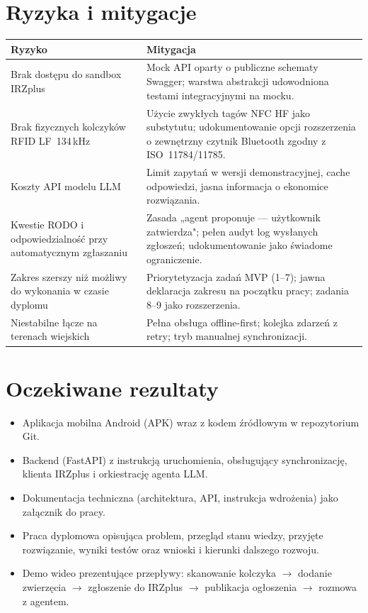 \documentclass[11pt,a4paper]{article}
\begin{document}
\section{Ryzyka i mitygacje}

\begin{longtable}{p{5cm}p{9cm}}
\toprule
\textbf{Ryzyko} & \textbf{Mitygacja} \\
\midrule
\endhead
Brak dostępu do sandbox IRZplus & Mock API oparty o publiczne schematy Swagger; warstwa abstrakcji udowodniona testami integracyjnymi na mocku. \\
Brak fizycznych kolczyków RFID LF~134\,kHz & Użycie zwykłych tagów NFC HF jako substytutu; udokumentowanie opcji rozszerzenia o zewnętrzny czytnik Bluetooth zgodny z ISO~11784/11785. \\
Koszty API modelu LLM & Limit zapytań w wersji demonstracyjnej, cache odpowiedzi, jasna informacja o ekonomice rozwiązania. \\
Kwestie RODO i odpowiedzialność przy automatycznym zgłaszaniu & Zasada „agent proponuje --- użytkownik zatwierdza"; pełen audyt log wysłanych zgłoszeń; udokumentowanie jako świadome ograniczenie. \\
Zakres szerszy niż możliwy do wykonania w czasie dyplomu & Priorytetyzacja zadań MVP (1--7); jawna deklaracja zakresu na początku pracy; zadania 8--9 jako rozszerzenia. \\
Niestabilne łącze na terenach wiejskich & Pełna obsługa offline-first; kolejka zdarzeń z retry; tryb manualnej synchronizacji. \\
\bottomrule
\end{longtable}

\section{Oczekiwane rezultaty}

\begin{itemize}
  \item Aplikacja mobilna Android (APK) wraz z kodem źródłowym w repozytorium Git.
  \item Backend (FastAPI) z instrukcją uruchomienia, obsługujący synchronizację, klienta IRZplus i orkiestrację agenta LLM.
  \item Dokumentacja techniczna (architektura, API, instrukcja wdrożenia) jako załącznik do pracy.
  \item Praca dyplomowa opisująca problem, przegląd stanu wiedzy, przyjęte rozwiązanie, wyniki testów oraz wnioski i kierunki dalszego rozwoju.
  \item Demo wideo prezentujące przepływy: skanowanie kolczyka $\rightarrow$ dodanie zwierzęcia $\rightarrow$ zgłoszenie do IRZplus $\rightarrow$ publikacja ogłoszenia $\rightarrow$ rozmowa z agentem.
\end{itemize}
\end{document}
